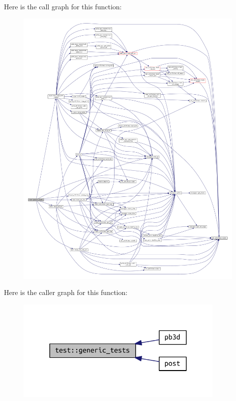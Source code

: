 Here is the call graph for this function\+:\nopagebreak
\begin{figure}[H]
\begin{center}
\leavevmode
\includegraphics[width=350pt]{namespacetest_aca21ee464c0b1f4b617177afdde110ec_cgraph}
\end{center}
\end{figure}
Here is the caller graph for this function\+:\nopagebreak
\begin{figure}[H]
\begin{center}
\leavevmode
\includegraphics[width=288pt]{namespacetest_aca21ee464c0b1f4b617177afdde110ec_icgraph}
\end{center}
\end{figure}
\mbox{\label{namespacetest_a0d4cb791bf762b2e52260fea7644a3ee}} 
